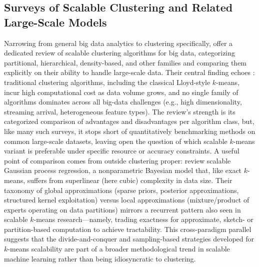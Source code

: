 \subsection{Surveys of Scalable Clustering and Related Large-Scale Models}
Narrowing from general big data analytics to clustering specifically, \cite{mahdi2021scalable} offer a dedicated review of scalable clustering algorithms for big data, categorizing partitional, hierarchical, density-based, and other families and comparing them explicitly on their ability to handle large-scale data. Their central finding echoes \cite{tsai2015big}: traditional clustering algorithms, including the classical Lloyd-style $k$-means, incur high computational cost as data volume grows, and no single family of algorithms dominates across all big-data challenges (e.g., high dimensionality, streaming arrival, heterogeneous feature types). The review's strength is its categorized comparison of advantages and disadvantages per algorithm class, but, like many such surveys, it stops short of quantitatively benchmarking methods on common large-scale datasets, leaving open the question of which scalable $k$-means variant is preferable under specific resource or accuracy constraints. A useful point of comparison comes from outside clustering proper: \cite{liu2020when} review scalable Gaussian process regression, a nonparametric Bayesian model that, like exact $k$-means, suffers from superlinear (here cubic) complexity in data size. Their taxonomy of global approximations (sparse priors, posterior approximations, structured kernel exploitation) versus local approximations (mixture/product of experts operating on data partitions) mirrors a recurrent pattern also seen in scalable $k$-means research---namely, trading exactness for approximate, sketch- or partition-based computation to achieve tractability. This cross-paradigm parallel suggests that the divide-and-conquer and sampling-based strategies developed for $k$-means scalability are part of a broader methodological trend in scalable machine learning rather than being idiosyncratic to clustering.

